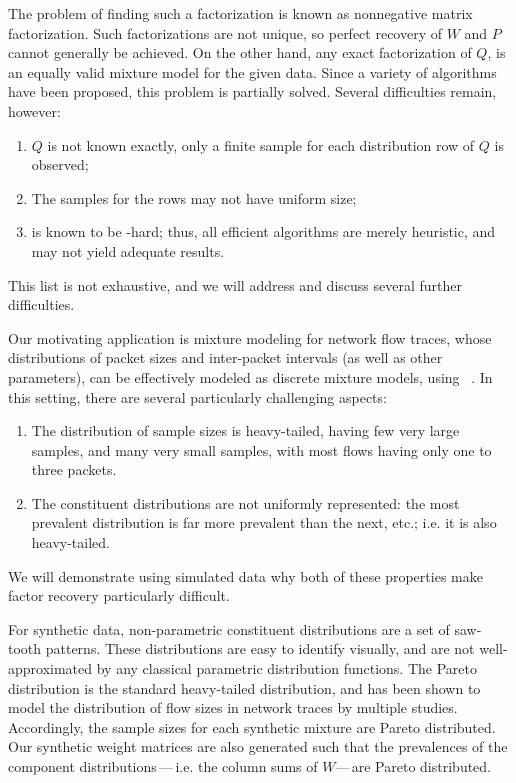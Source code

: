 \documentclass[conference]{IEEEtran}
\begin{document}
The problem of finding such a factorization is known as nonnegative matrix factorization.
Such factorizations are not unique, so perfect recovery of $W$ and $P$ cannot generally be achieved.
On the other hand, any exact factorization of $Q$, is an equally valid mixture model for the given data.
Since a variety of  algorithms have been proposed, this problem is partially solved.
Several difficulties remain, however:
\begin{enumerate}
  \item $Q$ is not known exactly, only a finite sample for each distribution row of $Q$ is observed;
  \item The samples for the rows may not have uniform size;
  \item {} is known to be -hard; thus, all efficient algorithms are merely heuristic, and may not yield adequate results.
\end{enumerate}
This list is not exhaustive, and we will address and discuss several further difficulties.

Our motivating application is mixture modeling for network flow traces, whose distributions of packet sizes and inter-packet intervals (as well as other parameters), can be effectively modeled as discrete mixture models, using ~\cite{Karpinski:2008}.
In this setting, there are several particularly challenging aspects:
\begin{enumerate}
  \item The distribution of sample sizes is heavy-tailed, having few very large samples, and many very small samples, with most flows having only one to three packets.
  \item The constituent distributions are not uniformly represented: the most prevalent distribution is far more prevalent than the next, etc.; i.e. it is also heavy-tailed.
\end{enumerate}
We will demonstrate using simulated data why both of these properties make factor recovery particularly difficult.

For synthetic data, non-parametric constituent distributions are a set of saw-tooth patterns.
These distributions are easy to identify visually, and are not well-approximated by any classical parametric distribution functions.
The Pareto distribution is the standard heavy-tailed distribution, and has been shown to model the distribution of flow sizes in network traces by multiple studies.
Accordingly, the sample sizes for each synthetic mixture are Pareto distributed.
Our synthetic weight matrices are also generated such that the prevalences of the component distributions\,---\,i.e. the column sums of $W$---\,are Pareto distributed.

\end{document}
